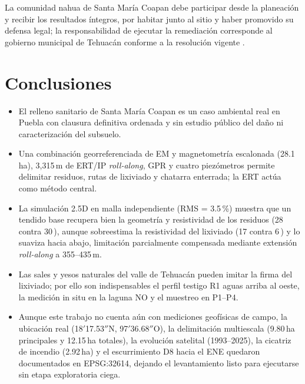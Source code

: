 La comunidad nahua de Santa María Coapan debe participar desde la planeación y recibir los resultados íntegros, por habitar junto al sitio y haber promovido su defensa legal; la responsabilidad de ejecutar la remediación corresponde al gobierno municipal de Tehuacán conforme a la resolución vigente \cite{greenpeace,profepa}.

\section{Conclusiones}
\begin{itemize}
\item El relleno sanitario de Santa María Coapan es un caso ambiental real en Puebla con clausura definitiva ordenada y sin estudio público del daño ni caracterización del subsuelo.
\item Una combinación georreferenciada de EM y magnetometría escalonada (28.1\,ha), 3,315\,m de ERT/IP \emph{roll-along}, GPR y cuatro piezómetros permite delimitar residuos, rutas de lixiviado y chatarra enterrada; la ERT actúa como método central.
\item La simulación 2.5D en malla independiente (RMS = 3.5\,\%) muestra que un tendido base recupera bien la geometría y resistividad de los residuos (28 contra 30\,\ohmm), aunque sobreestima la resistividad del lixiviado (17 contra 6\,\ohmm) y lo suaviza hacia abajo, limitación parcialmente compensada mediante extensión \emph{roll-along} a 355--435\,m.
\item Las sales y yesos naturales del valle de Tehuacán pueden imitar la firma del lixiviado; por ello son indispensables el perfil testigo R1 aguas arriba al oeste, la medición in situ en la laguna NO y el muestreo en P1--P4.
\item Aunque este trabajo no cuenta aún con mediciones geofísicas de campo, la ubicación real (18$'$17.53$''$N, 97$'$36.68$''$O), la delimitación multiescala (9.80\,ha principales y 12.15\,ha totales), la evolución satelital (1993--2025), la cicatriz de incendio (2.92\,ha) y el escurrimiento D8 hacia el ENE quedaron documentados en EPSG:32614, dejando el levantamiento listo para ejecutarse sin etapa exploratoria ciega.
\end{itemize}

